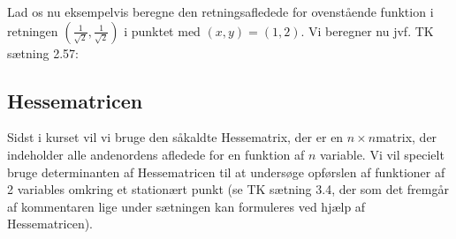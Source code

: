 \documentclass[letterpaper,10pt,english]{jupyterBook}
\begin{document}
Lad os nu eksempelvis beregne den retningsafledede for ovenstående funktion i retningen \(\left(\frac{1}{\sqrt{2}},\frac{1}{\sqrt{2}}\right)\) i punktet med \((x, y) = (1, 2)\). Vi beregner nu jvf. TK sætning 2.57:

\begin{sphinxVerbatim}[commandchars=\\\{\}]
         
             

  \PYG{p}{[} \PYG{p}{]}

  

    
\end{sphinxVerbatim}

\noindent{}

\noindent{}

\noindent{}

\noindent{}


\subsection{Hessematricen}
\label{\detokenize{notebooks/sympy/Notebook_FlereVar_analyse:hessematricen}}
Sidst i kurset vil vi bruge den såkaldte Hessematrix, der er en \(n\times n\)\sphinxhyphen{}matrix, der indeholder alle andenordens afledede for en funktion af \(n\) variable. Vi vil specielt bruge determinanten af Hessematricen til at undersøge opførslen af funktioner af 2 variables omkring et stationært punkt (se TK sætning 3.4, der som det fremgår af kommentaren lige under sætningen kan formuleres ved hjælp af Hessematricen).
\end{document}
